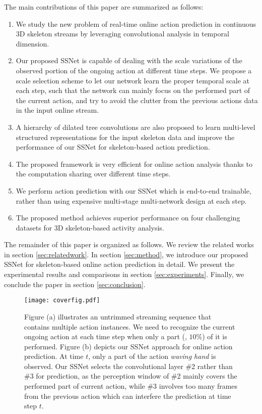 \documentclass[10pt,twocolumn,letterpaper]{article}
\begin{document}
The main contributions of this paper are summarized as follows:

\begin{enumerate}
  \item
We study the new problem of real-time online action prediction in continuous 3D skeleton streams by leveraging convolutional analysis in temporal dimension.
  \item
Our proposed SSNet is capable of dealing with the scale variations of the observed portion of the ongoing action at different time steps.
We propose a scale selection scheme to let our network learn the proper temporal scale at each step,
such that the network can mainly focus on the performed part of the current action, and try to avoid the clutter from the previous actions data in the input online stream.
\item
A hierarchy of dilated tree convolutions are also proposed
to learn multi-level structured representations for the input skeleton data and improve the performance of our SSNet for skeleton-based action prediction.
  \item
The proposed framework is very efficient for online action analysis thanks to the computation sharing over different time steps.
  \item
We perform action prediction with our SSNet which is end-to-end trainable, rather than using expensive multi-stage multi-network design at each step.
  \item
The proposed method achieves superior performance on four challenging datasets for 3D skeleton-based activity analysis.
\end{enumerate}


The remainder of this paper is organized as follows.
We review the related works in section \ref{sec:relatedwork}.
In section \ref{sec:method}, we introduce our proposed SSNet for skeleton-based online action prediction in detail.
We present the experimental results and comparisons in section \ref{sec:experiments}.
Finally, we conclude the paper in section \ref{sec:conclusion}.

\begin{figure}[t]
	\centerline{\texttt{[image: coverfig.pdf]}}
	\caption{ Figure (a) illustrates an untrimmed streaming sequence that contains multiple action instances.
            We need to recognize the current ongoing action at each time step when only a part (\eg, $10\%$) of it is performed.
            Figure (b) depicts our SSNet approach for online action prediction.
At time $t$, only a part of the action \emph{waving hand} is observed.
            Our SSNet selects the convolutional layer \#2 rather than \#3 for prediction,
            as the perception window of \#2 mainly covers the performed part of current action,
            while \#3 involves too many frames from the previous action which can interfere the prediction at time step $t$.}
	\label{fig:coverfig}
\end{figure}
\end{document}
